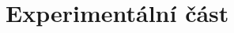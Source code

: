 \documentclass[thesis=M,czech]{FITthesis}[2012/06/26]
\newcommand{\acrlabel}[1]{acr:#1}
\newcommand{\acr}[1]{\acrshort{\acrlabel{#1}}}
\begin{document}


\chapter{Experimentální část}\label{ch:exp}


\begin{conclusion}\label{ch:outro}
\end{conclusion}


\appendix






\printglossary[type=\acronymtype, title=Seznam použitých symbolů a zkratek]






\end{document}
